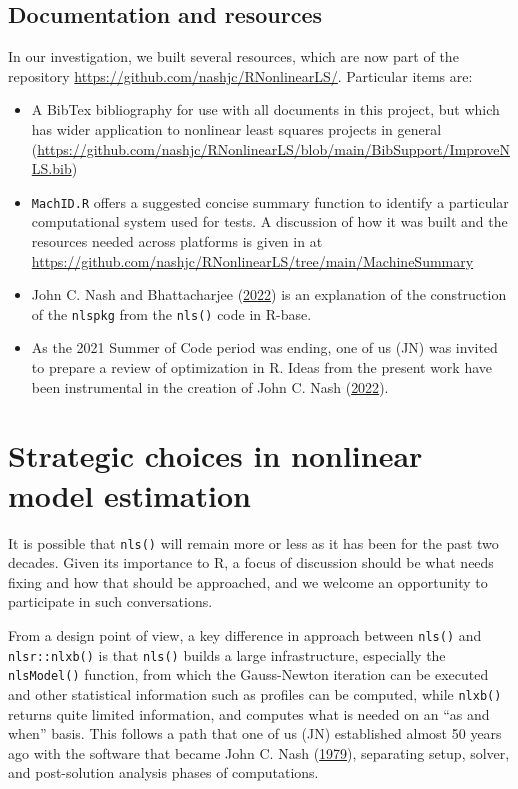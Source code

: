 \documentclass[
]{article}
\begin{document}
\hypertarget{documentation-and-resources}{%
\subsection{Documentation and
resources}\label{documentation-and-resources}}

In our investigation, we built several resources, which are now part of
the repository \url{https://github.com/nashjc/RNonlinearLS/}. Particular
items are:

\begin{itemize}
\item
  A BibTex bibliography for use with all documents in this project, but
  which has wider application to nonlinear least squares projects in
  general
  (\url{https://github.com/nashjc/RNonlinearLS/blob/main/BibSupport/ImproveNLS.bib})
\item
  \texttt{MachID.R} offers a suggested concise summary function to
  identify a particular computational system used for tests. A
  discussion of how it was built and the resources needed across
  platforms is given in at
  \url{https://github.com/nashjc/RNonlinearLS/tree/main/MachineSummary}
\item
  John C. Nash and Bhattacharjee
  (\protect\hyperlink{ref-PkgFromRbase22}{2022}) is an explanation of
  the construction of the \texttt{nlspkg} from the \texttt{nls()} code
  in R-base.
\item
  As the 2021 Summer of Code period was ending, one of us (JN) was
  invited to prepare a review of optimization in R. Ideas from the
  present work have been instrumental in the creation of John C. Nash
  (\protect\hyperlink{ref-NashWires22}{2022}).
\end{itemize}

\hypertarget{strategic-choices-in-nonlinear-model-estimation}{%
\section{Strategic choices in nonlinear model
estimation}\label{strategic-choices-in-nonlinear-model-estimation}}

It is possible that \texttt{nls()} will remain more or less as it has
been for the past two decades. Given its importance to R, a focus of
discussion should be what needs fixing and how that should be
approached, and we welcome an opportunity to participate in such
conversations.

From a design point of view, a key difference in approach between
\texttt{nls()} and \texttt{nlsr::nlxb()} is that \texttt{nls()} builds a
large infrastructure, especially the \texttt{nlsModel()} function, from
which the Gauss-Newton iteration can be executed and other statistical
information such as profiles can be computed, while \texttt{nlxb()}
returns quite limited information, and computes what is needed on an
``as and when'' basis. This follows a path that one of us (JN)
established almost 50 years ago with the software that became John C.
Nash (\protect\hyperlink{ref-cnm79}{1979}), separating setup, solver,
and post-solution analysis phases of computations.
\end{document}

